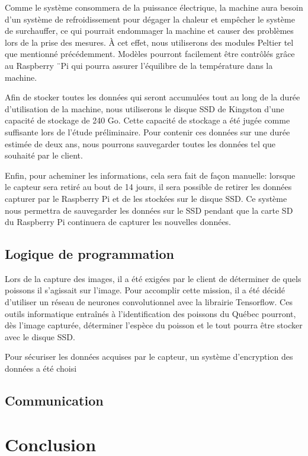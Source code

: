 Comme le système consommera de la puissance électrique, la machine aura besoin d'un système de refroidissement pour dégager la chaleur et empêcher le système de surchauffer, ce qui pourrait endommager la machine et causer des problèmes lors de la prise des mesures. À cet effet, nous utiliserons des modules Peltier tel que mentionné précédemment. Modèles pourront facilement être contrôlés grâce au Raspberry ¨Pi qui pourra assurer l'équilibre de la température dans la machine.

Afin de stocker toutes les données qui seront accumulées tout au long de la durée d'utilisation de la machine, nous utiliserons le disque SSD de Kingston d'une capacité de stockage de 240 Go. Cette capacité de stockage a été jugée comme suffisante lors de l'étude préliminaire. Pour contenir ces données sur une durée estimée de deux ans, nous pourrons sauvegarder toutes les données tel que souhaité par le client.

Enfin, pour acheminer les informations, cela sera fait de façon manuelle: lorsque le capteur sera retiré au bout de 14 jours, il sera possible de retirer les données capturer par le Raspberry Pi et de les stockées sur le disque SSD. Ce système nous permettra de sauvegarder les données sur le SSD pendant que la carte SD du Raspberry Pi continuera de capturer les nouvelles données.

\subsection{Logique de programmation}

Lors de la capture des images, il a été exigées par le client de déterminer de quels poissons il s'agissait sur l'image. Pour accomplir cette mission, il a été décidé d'utiliser un réseau de neurones convolutionnel avec la librairie Tensorflow. Ces outils informatique entraînés à l'identification des poissons du Québec pourront, dès l'image capturée, déterminer l'espèce du poisson et le tout pourra être stocker avec le disque SSD.

Pour sécuriser les données acquises par le capteur, un système d'encryption des données a été choisi

\subsection{Communication}


\section{Conclusion}

